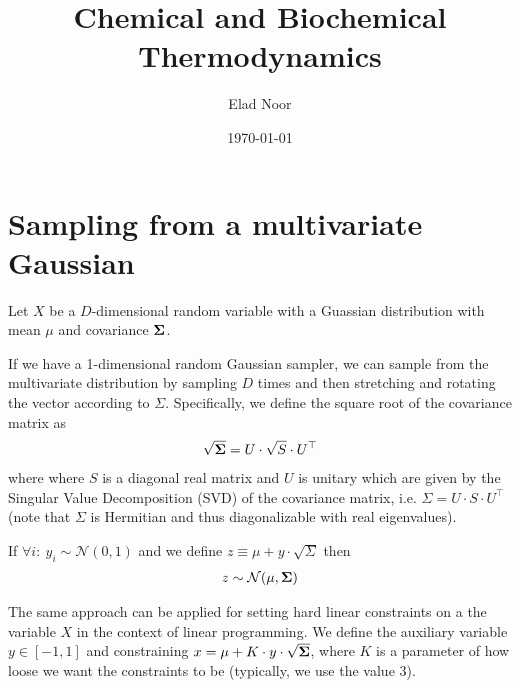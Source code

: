 \documentclass[11pt]{paper}
\title{Chemical and Biochemical Thermodynamics}
\author{Elad Noor}
\date{\today}
\begin{document}
\maketitle

\section{Sampling from a multivariate Gaussian}
Let $X$ be a $D$-dimensional random variable with a Guassian distribution  with mean $\mu$ and covariance $\bold{\Sigma}$.

If we have a 1-dimensional random Gaussian sampler, we can sample from the multivariate distribution by sampling $D$ times and then stretching and rotating the vector according to $\Sigma$. Specifically, we define the square root of the covariance matrix as
\begin{eqnarray}
	\sqrt{\bold{\Sigma}} = U \cdot \sqrt{S} \cdot U^\top
\end{eqnarray}
where where $S$ is a diagonal real matrix and $U$ is unitary which are given by the Singular Value Decomposition (SVD) of the covariance matrix, i.e. $\Sigma = U \cdot S \cdot U^\top$ (note that $\Sigma$ is Hermitian and thus diagonalizable with real eigenvalues).

If $\forall i :~ y_i \sim \mathcal{N}(0, 1)$ and we define $z \equiv \mu + y \cdot \sqrt{\Sigma}$ then
\begin{eqnarray}
z \sim \mathcal{N}(\mu, \bold{\Sigma})
\end{eqnarray}

The same approach can be applied for setting hard linear constraints on a the variable $X$ in the context of linear programming. We define the auxiliary variable $y \in [-1, 1]$ and constraining $x = \mu + K \cdot y \cdot \sqrt{\bold{\Sigma}}$, where $K$ is a parameter of how loose we want the constraints to be (typically, we use the value $3$).
\end{document}
